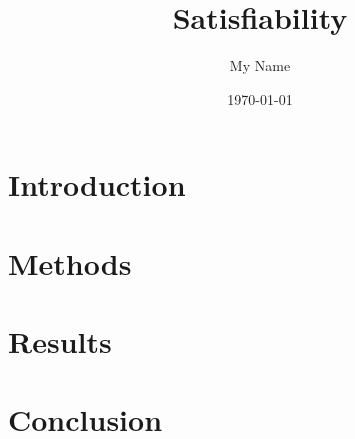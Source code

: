 \documentclass{article}
\title{Satisfiability}
\author{My Name}
\date{\today}
\begin{document}
\maketitle

\section{Introduction}
\lipsum[1]

\section{Methods}
\lipsum[2]

\section{Results}
\lipsum[3]

\section{Conclusion}
\lipsum[4]
\end{document}
